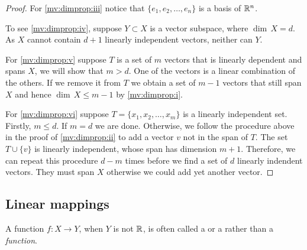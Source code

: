 \begin{proof}
For \ref{mv:dimprop:iii} notice that $\{ e_1, e_2, \ldots, e_n \}$ is a basis of ${\mathbb{R}}^n$.

To see \ref{mv:dimprop:iv},
suppose $Y \subset X$ is a vector subspace,
where $\dim \, X = d$.  As $X$ cannot contain $d+1$ linearly independent
vectors, neither can $Y$.

For \ref{mv:dimprop:v} suppose $T$ is a set of $m$ vectors
that is linearly dependent
and spans $X$, we will show that $m > d$.  One of the
vectors is a linear combination of the others.  If we remove it
from $T$ we obtain a set of $m-1$ vectors that still span $X$ and hence
$\dim \, X \leq m-1$ by \ref{mv:dimprop:i}.

For \ref{mv:dimprop:vi} suppose $T = \{ x_1, x_2, \ldots, x_m \}$ is
a linearly independent set.  Firstly, $m \leq d$.
If $m=d$ we are done.  Otherwise,
we follow the procedure above in the proof of
\ref{mv:dimprop:ii}
to add a vector $v$ not in the span of $T$.  The set
$T \cup \{ v \}$
is linearly independent, whose span has dimension $m+1$.
Therefore, we can repeat this procedure $d-m$ times before
we find a set of $d$ linearly indendent vectors.
They must span $X$ otherwise we could add yet another vector.
\end{proof}

\subsection{Linear mappings}

A function $f \colon X \to Y$, when $Y$ is not ${\mathbb{R}}$, is often called a
\emph{} or a \emph{}
rather than a \emph{function}.


